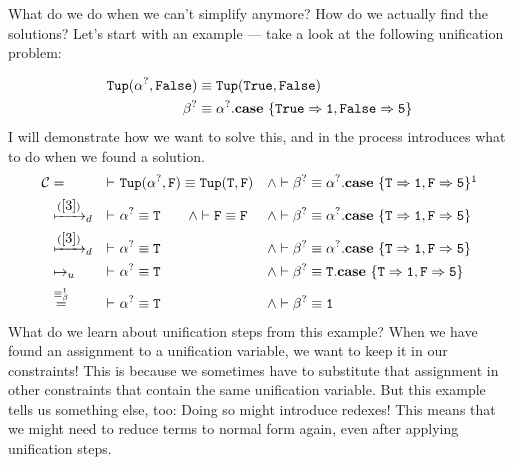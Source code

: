 \documentclass[twoside,12pt,a4paper]{article}
\begin{document}
What do we do when we can't simplify anymore? How do we actually find the solutions?
Let's start with an example --- take a look at the following unification problem:
\begin{example}[Unification]
    \begin{align*}
        \mathtt{Tup(\alpha^?, False)}&\equiv \mathtt{Tup(True, False)}\\
        \beta^?&\equiv \alpha^?.\textbf{case}\ \{\mathtt{True \Rightarrow 1, False\Rightarrow 5}\}
    \end{align*}        
    I will demonstrate how we want to solve this, and in the process introduces what to do when we found a solution.   
    \begin{align*}
        \constraints &= &\vdash\ & \mathtt{Tup(\alphaunifvar, F)}\equiv \mathtt{Tup(T, F)}&\wedge&
        \vdash \betaunifvar\equiv \alphaunifvar.\expatmatch{\mathtt{T \Rightarrow 1, F\Rightarrow 5}}\footnotemark[1]\\
        &\xmapsto{(\cref{3})}_d &\vdash\ & \mathtt{\alphaunifvar\equiv T}\qquad\wedge\vdash \mathtt{F\equiv F} &\wedge& 
        \vdash \betaunifvar\equiv \alphaunifvar.\expatmatch{\mathtt{T \Rightarrow 1, F\Rightarrow 5}}\\
        &\xmapsto{(\cref{3})}_d &\vdash\ & \mathtt{\alphaunifvar\equiv T} &\wedge& 
        \vdash \betaunifvar\equiv \alphaunifvar.\expatmatch{\mathtt{T \Rightarrow 1, F\Rightarrow 5}}\\
        &\mapsto_u &\vdash\ &\mathtt{\alphaunifvar\equiv T} &\wedge&
        \vdash \betaunifvar\equiv \mathtt{T}.\expatmatch{\mathtt{T \Rightarrow 1, F\Rightarrow 5}}\\
        &\stackrel{\betaconv}{=} &\vdash\ &\mathtt{\alphaunifvar\equiv T} &\wedge&
        \vdash \betaunifvar\equiv \mathtt{1}
    \end{align*}
What do we learn about unification steps from this example? When we have found an assignment to a unification variable, we want to keep it in our constraints!
This is because we sometimes have to substitute that assignment in other constraints that contain the same unification variable.
But this example tells us something else, too: Doing so might introduce redexes!
This means that we might need to reduce terms to normal form again, even after applying unification steps. 
\end{example}
\end{document}
